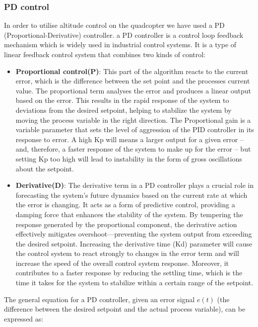 \documentclass{article}
\begin{document}
\subsubsection{PD control}\label{PD_control} In order to utilise altitude
control on the quadcopter we have used a PD (Proportional-Derivative)
controller. a PD controller is a control loop feedback mechanism which is widely
used in industrial control systems. It is a type of linear feedback control
system that combines two kinds of control:
\begin{itemize}
  \item \textbf{Proportional control(P)}: This part of the algorithm reacts to
  the current error, which is the difference between the set point and the
  processes current value. The proportional term analyses the error and produces
  a linear output based on the error. This results in the rapid response of the
  system to deviations from the desired setpoint, helping to stabilize the
  system by moving the process variable in the right direction. The Proportional
  gain is a variable parameter that sets the level of aggression of the PID
  controller in its response to error. A high Kp will means a larger output for
  a given error – and, therefore, a faster response of the system to make up for
  the error – but setting Kp too high will lead to instability in the form of
  gross oscillations about the setpoint.
  \item \textbf{Derivative(D)}: The derivative term in a PD controller plays a
  crucial role in forecasting the system's future dynamics based on the current
  rate at which the error is changing. It acts as a form of predictive control,
  providing a damping force that enhances the stability of the system. By
  tempering the response generated by the proportional component, the derivative
  action effectively mitigates overshoot—preventing the system output from
  exceeding the desired setpoint. Increasing the derivative time (Kd) parameter
  will cause the control system to react strongly to changes in the error term
  and will increase the speed of the overall control system response. Moreover,
  it contributes to a faster response by reducing the settling time, which is
  the time it takes for the system to stabilize within a certain range of the
  setpoint.
\end{itemize}
The general equation for a PD controller, given an error signal \(e(t)\) (the
difference between the desired setpoint and the actual process variable), can be
expressed as:
\end{document}
